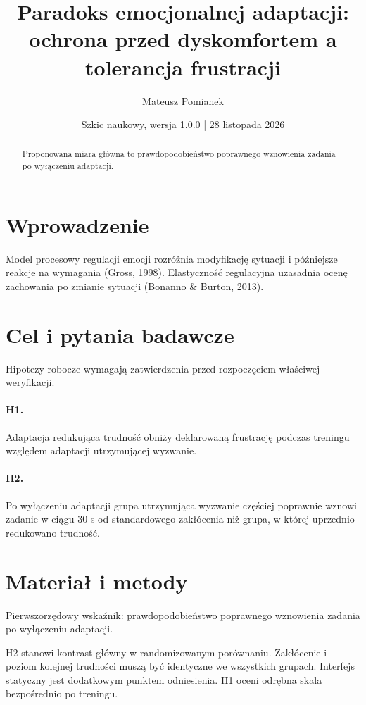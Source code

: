 \documentclass[11pt,a4paper]{article}
\title{Paradoks emocjonalnej adaptacji: ochrona przed dyskomfortem a tolerancja frustracji}
\author{Mateusz Pomianek}
\date{Szkic naukowy, wersja 1.0.0 | 28 listopada 2026}
\begin{document}
\maketitle

\begin{abstract}

Proponowana miara główna to prawdopodobieństwo poprawnego wznowienia zadania po wyłączeniu adaptacji.

\end{abstract}

\section{Wprowadzenie}

Model procesowy regulacji emocji rozróżnia modyfikację sytuacji i późniejsze reakcje na wymagania (Gross, 1998). Elastyczność regulacyjna uzasadnia ocenę zachowania po zmianie sytuacji (Bonanno \& Burton, 2013).

\section{Cel i pytania badawcze}

Hipotezy robocze wymagają zatwierdzenia przed rozpoczęciem właściwej weryfikacji.

\paragraph{H1.} Adaptacja redukująca trudność obniży deklarowaną frustrację podczas treningu względem adaptacji utrzymującej wyzwanie.

\paragraph{H2.} Po wyłączeniu adaptacji grupa utrzymująca wyzwanie częściej poprawnie wznowi zadanie w ciągu 30 s od standardowego zakłócenia niż grupa, w której uprzednio redukowano trudność.

\section{Materiał i metody}

Pierwszorzędowy wskaźnik: prawdopodobieństwo poprawnego wznowienia zadania po wyłączeniu adaptacji.

H2 stanowi kontrast główny w randomizowanym porównaniu. Zakłócenie i poziom kolejnej trudności muszą być identyczne we wszystkich grupach. Interfejs statyczny jest dodatkowym punktem odniesienia. H1 oceni odrębna skala bezpośrednio po treningu.
\end{document}
